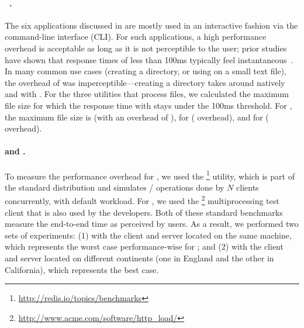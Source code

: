 
\paragraph{\gnu~\coreutils.} The six \coreutils applications discussed in 
 are mostly used in an interactive fashion via the
command-line interface (CLI). For such applications, a high performance
overhead is acceptable as long as it is not perceptible to the user;
prior studies have shown that response times of less than 100ms
typically feel instantaneous~\cite{card:human_proc}. In many common use
cases (\eg creating a directory, or using \cut on a small text file),
the overhead of \mx was imperceptible---\eg creating a directory takes
around \avgMkdirNative natively and \avgMkdirMx with \mx. For the three
utilities that process files, we calculated the maximum file size for
which the response time with \mx stays under the 100ms threshold.  For
\cut, the maximum file size is \cutCutoffSize (with an overhead of
\cutCutoffOver), for \mdsum \mdsumCutoffSize (\mdsumCutoffOver
overhead), and for \shasum \shasumCutoffSize (\shasumCutoffOver
overhead).



\paragraph{\redis and \lighttpd.} To measure the performance overhead for \redis, 
we used
the \redisbenchmark\footnote{\url{http://redis.io/topics/benchmarks}}
utility, which is part of the standard \redis distribution and
simulates / operations done by $N$ clients
concurrently, with default workload.  For \lighttpd, we used the
\httpload\footnote{\url{http://www.acme.com/software/http_load/}}
multiprocessing test client that is also used by the \lighttpd
developers.  Both of these standard benchmarks measure the end-to-end
time as perceived by users.  As a result, we performed two sets of
experiments: (1) with the client and server located on the same
machine, which represents the worst case performance-wise for \mx; and
(2) with the client and server located on different continents (one in
England and the other in California), which represents the best case.

